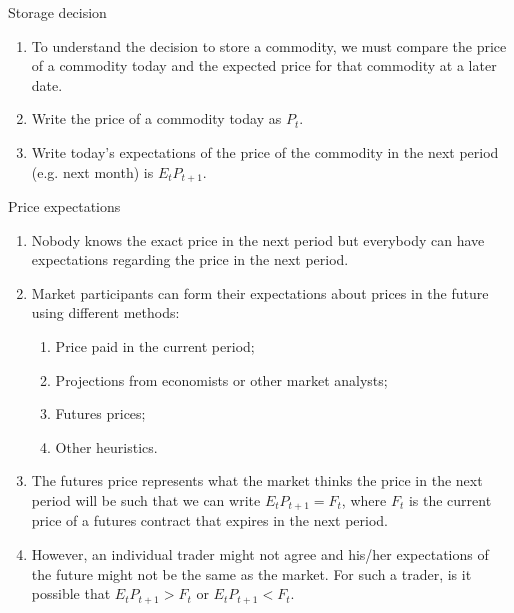 \documentclass[table,xcolor=pdftex,dvipsnames, handout]{beamer}\usepackage[]{graphicx}\usepackage[]{color}
\begin{document}

\begin{frame}{Storage decision}
\begin{enumerate}[label=\textbullet]
  \item To understand the decision to store a commodity, we must compare the price of a commodity today and the expected price for that commodity at a later date.
  \item Write the price of a commodity today as $P_t$.
  \item Write today's expectations of the price of the commodity in the next period (e.g. next month) is $E_t P_{t+1}$.
\end{enumerate}
\end{frame}


\begin{frame}{Price expectations}
\begin{enumerate}[label=\textbullet]
    \item Nobody knows the exact price in the next period but everybody can have expectations regarding the price in the next period.
    \item Market participants can form their expectations about prices in the future using different methods:
    \begin{enumerate}[label=-]
      \item Price paid in the current period;
      \item Projections from economists or other market analysts;
      \item Futures prices;
      \item Other heuristics.
    \end{enumerate}
    \item The futures price represents what the market thinks the price in the next period will be such that we can write $E_t P_{t+1} = F_t$, where $F_t$ is the current price of a futures contract that expires in the next period.
    \item However, an individual trader might not agree and his/her expectations of the future might not be the same as the market. For such a trader, is it possible that $E_t P_{t+1} >F_t$ or $E_t P_{t+1} < F_t$.
\end{enumerate}
\end{frame}
\end{document}
